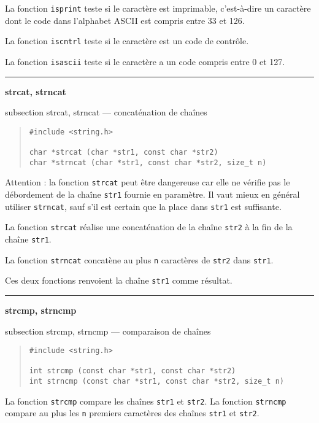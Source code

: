 \documentclass [twoside] {report}
\newcommand {\primitive} [1]
    {
	\phantomsection
	{\large \textbf {#1}}
	\addcontentsline {toc} {subsection} {#1}
    }
\newcommand {\separation}
    {
	\vspace {5mm}
	\nopagebreak
	\hrule
    }
\begin{document}
La fonction \texttt {isprint} teste si le caractère est
imprimable, c'est-à-dire un caractère dont le code dans
l'alphabet ASCII est compris entre 33 et 126.

La fonction \texttt {iscntrl} teste si le caractère est un
code de contrôle.

La fonction \texttt {isascii} teste si le caractère a un code
compris entre 0 et 127.


\separation 
\primitive {strcat, strncat} --- concaténation de chaînes

\begin {quote}
\begin {verbatim}
#include <string.h>

char *strcat (char *str1, const char *str2)
char *strncat (char *str1, const char *str2, size_t n)
\end{verbatim}
\end {quote}

Attention : la fonction \texttt {strcat} peut être dangereuse car
elle ne vérifie pas le débordement de la chaîne \texttt{str1} fournie
en paramètre. Il vaut mieux en général utiliser \texttt{strncat},
sauf s'il est certain que la place dans \texttt{str1} est suffisante.

La fonction \texttt {strcat} réalise une concaténation de la
chaîne \texttt {str2} à la fin de la chaîne \texttt {str1}.

La fonction \texttt {strncat} concatène au plus \texttt {n} caractères
de \texttt {str2} dans \texttt {str1}.

Ces deux fonctions renvoient la chaîne \texttt {str1} comme
résultat.


\separation 
\primitive {strcmp, strncmp} --- comparaison de chaînes

\begin {quote}
\begin {verbatim}
#include <string.h>

int strcmp (const char *str1, const char *str2)
int strncmp (const char *str1, const char *str2, size_t n)
\end{verbatim}
\end {quote}

La fonction \texttt {strcmp} compare les chaînes \texttt {str1} et
\texttt {str2}. La fonction \texttt {strncmp} compare au plus les \texttt {n}
premiers caractères des chaînes \texttt {str1} et \texttt {str2}.
\end{document}
